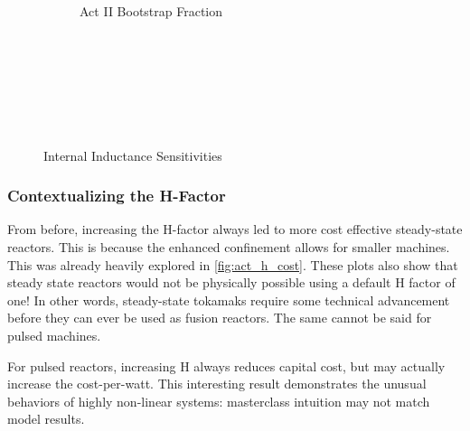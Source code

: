 \begin{figure*}
\begin{subfigure}[t]{0.45\textwidth}
\begin{adjustbox}{width=\textwidth}
			\Large
			
		\end{adjustbox}
        \caption{Act II Bootstrap Fraction}
    \end{subfigure}
    \hfill \hfill ~\\ ~\\ ~\\ ~\\
    \caption{Internal Inductance Sensitivities} ~ \\
    \label{fig:inductance_sensitivities}
\end{figure*}

\subsubsection{Contextualizing the H-Factor}

From before, increasing the H-factor always led to more cost effective steady-state reactors. This is because the enhanced confinement allows for smaller machines. This was already heavily explored in \cref{fig:act_h_cost}. These plots also show that steady state reactors would not be physically possible using a default H factor of one! In other words, steady-state tokamaks require some technical advancement before they can ever be used as fusion reactors. The same cannot be said for pulsed machines.

For pulsed reactors, increasing H always reduces capital cost, but may actually increase the cost-per-watt.  This interesting result demonstrates the unusual behaviors of highly non-linear systems: masterclass intuition may not match model results.

